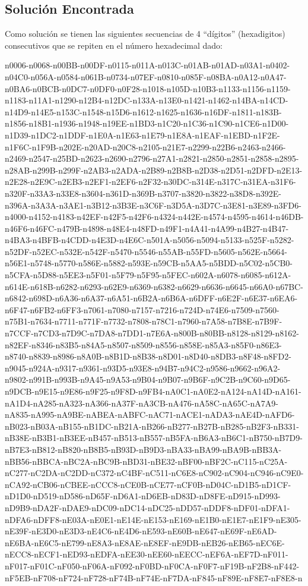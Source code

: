 \documentclass[10pt,letterpaper]{article}
\begin{document}
\subsection{Solución Encontrada}

Como solución se tienen las siguientes secuencias de 4 “dígitos” (hexadigitos) consecutivos que se repiten en el número hexadecimal dado:

n0006-n0068-n00BB-n00DF-n0115-n011A-n013C-n01AB-n01AD-n03A1-n0402-n04C0-n056A-n0584-n061B-n0734-n07EF-n0810-n085F-n08BA-n0A12-n0A47-n0BA6-n0BCB-n0DC7-n0DF0-n0F28-n1018-n105D-n10B3-n1133-n1156-n1159-n1183-n11A1-n1290-n12B4-n12DC-n133A-n13E0-n1421-n1462-n14BA-n14CD-n14D9-n14E5-n153C-n1548-n15D6-n1612-n1625-n1636-n16DF-n1811-n183B-n1856-n18B1-n1936-n1948-n19EE-n1BD3-n1C20-n1C36-n1C90-n1CE6-n1D00-n1D39-n1DC2-n1DDF-n1E0A-n1E63-n1E79-n1E8A-n1EAF-n1EBD-n1F2E-n1F6C-n1F9B-n202E-n20AD-n20C8-n2105-n21E7-n2299-n22B6-n2463-n2466-n2469-n2547-n25BD-n2623-n2690-n2796-n27A1-n2821-n2850-n2851-n2858-n2895-n28AB-n299B-n299F-n2AB3-n2ADA-n2B89-n2B8B-n2D38-n2D51-n2DFD-n2E13-n2E28-n2E9C-n2EB3-n2EF1-n2EF6-n2F32-n30DC-n314E-n317C-n31EA-n31F6-n320F-n33A3-n33E8-n3604-n361D-n369B-n3707-n3820-n3822-n38D8-n392E-n396A-n3A3A-n3AE1-n3B12-n3B3E-n3C6F-n3D5A-n3D7C-n3E81-n3E89-n3FD6-n4000-n4152-n4183-n42EF-n42F5-n42F6-n4324-n442E-n4574-n4595-n4614-n46DB-n46F6-n46FC-n479B-n4898-n48E4-n48FD-n49F1-n4A41-n4A99-n4B27-n4B47-n4BA3-n4BFB-n4CDD-n4E3D-n4E6C-n501A-n5056-n5094-n5133-n525F-n5282-n52DF-n52EC-n532E-n542F-n5470-n5546-n55AB-n55FD-n5605-n562E-n5664-n56E1-n5748-n5770-n586E-n5882-n593E-n59CB-n5AA5-n5BDD-n5C02-n5CB0-n5CFA-n5D88-n5EE3-n5F01-n5F79-n5F95-n5FEC-n602A-n6078-n6085-n612A-n614E-n618B-n6282-n6293-n62E9-n6369-n6382-n6629-n6636-n6645-n66A0-n67BC-n6842-n698D-n6A36-n6A37-n6A51-n6B2A-n6B6A-n6DFF-n6E2F-n6E37-n6EA6-n6F47-n6FB2-n6FF3-n7061-n7080-n7157-n7216-n724D-n74E6-n7509-n7560-n75B1-n7634-n7711-n771F-n7732-n7808-n78C1-n7960-n7A58-n7B8E-n7B9F-n7CCF-n7CD3-n7D9C-n7DA8-n7DD1-n7E6A-n800B-n80BB-n8128-n8129-n8162-n82EF-n8346-n83B5-n84A5-n8507-n8509-n8556-n858E-n85A3-n85F0-n86E3-n8740-n8839-n8986-n8A0B-n8B1D-n8B38-n8D01-n8D40-n8DB3-n8F48-n8FD2-n9045-n924A-n9317-n9361-n93D5-n93E8-n94B7-n94C2-n9586-n9662-n96A2-n9802-n991B-n993B-n9A45-n9A53-n9B04-n9B07-n9B6F-n9C2B-n9C60-n9D65-n9DCB-n9E15-n9E86-n9F25-n9F8D-n9FB4-nA0C1-nA0E2-nA124-nA14D-nA161-nA1D4-nA285-nA323-nA366-nA37F-nA3CB-nA476-nA58C-nA65C-nA7A9-nA835-nA995-nA9BE-nABEA-nABFC-nAC71-nACE1-nADA3-nAE4D-nAFD6-nB023-nB03A-nB155-nB1DC-nB21A-nB266-nB277-nB27B-nB285-nB2F3-nB331-nB38E-nB3B1-nB3EE-nB457-nB513-nB557-nB5FA-nB6A3-nB6C1-nB750-nB7D9-nB7E3-nB812-nB820-nB8B5-nB93D-nB9D3-nBA33-nBA99-nBA9B-nBB3A-nBB56-nBBCA-nBC2A-nBC9B-nBD31-nBE32-nBF00-nBF2C-nC115-nC25A-nC277-nC2DA-nC2DD-nC372-nC4BF-nC511-nC6E8-nC902-nC904-nC946-nC9E0-nCA92-nCB06-nCBEE-nCCC8-nCE0B-nCE77-nCF0B-nD04C-nD1B5-nD1CF-nD1D0-nD519-nD586-nD65F-nD6A1-nD6EB-nD83D-nD8FE-nD915-nD993-nD9B9-nDA2F-nDAE9-nDC09-nDC14-nDC25-nDD57-nDDF8-nDF01-nDFA1-nDFA6-nDFF8-nE03A-nE0E1-nE14E-nE153-nE169-nE1B0-nE1E7-nE1F9-nE305-nE39F-nE3D0-nE3D3-nE4C6-nE4D6-nE593-nE60B-nE647-nE69F-nE6AD-nE6BA-nE6C5-nE799-nE8A3-nE8AE-nE8EF-nE9DB-nEB26-nEB65-nEC6E-nECC8-nECF1-nED93-nEDFA-nEE30-nEE60-nEECC-nEF6A-nEF7D-nF011-nF017-nF01C-nF050-nF06A-nF092-nF0BD-nF0CA-nF0F7-nF19B-nF2B8-nF442-nF5EB-nF708-nF724-nF728-nF74B-nF74E-nF7DA-nF845-nF89E-nF8E7-nF8E8-n
\end{document}
